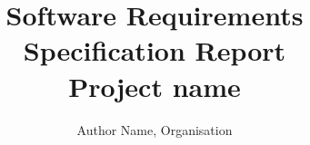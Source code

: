 \documentclass[a4paper, 12pt]{article}
\begin{document}
\begin{titlepage}
    \title{Software Requirements Specification Report \\ \textbf{\huge Project name}}
    \author{Author Name, Organisation}
    \maketitle
\end{titlepage}

    \tableofcontents
    \newpage

    \raggedright
    \setlength{\parindent}{20pt}

    
    
    
    
    
\end{document}
